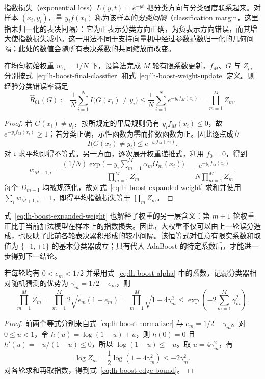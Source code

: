 指数损失（exponential loss）$L(y,t)=e^{-yt}$ 把分类方向与分类强度联系起来。对样本 $(x_i,y_i)$，量 $y_if(x_i)$ 称为该样本的\emph{分类间隔}（classification margin，这里指未归一化的表决间隔）：它为正表示分类方向正确，为负表示方向错误，而其增大使指数损失减小。这一用法不同于支持向量机中经过参数范数归一化的几何间隔；此处的数值会随所有表决系数的共同缩放而改变。

\begin{theorem}[训练误差的指数损失上界]
\label{thm:lh-boost-training-bound}
在均匀初始权重 $w_{1i}=1/N$ 下，设算法完成 $M$ 轮有限系数更新，$f_M$、$G$ 与 $Z_m$ 分别按式~\eqref{eq:lh-boost-final-classifier} 和式~\eqref{eq:lh-boost-weight-update} 定义。则经验分类错误率满足
\begin{equation}
 \widehat R_{01}(G):=\frac1N\sum_{i=1}^{N}I\bigl(G(x_i)\ne y_i\bigr)
 \leq\frac1N\sum_{i=1}^{N}e^{-y_if_M(x_i)}
 =\prod_{m=1}^{M}Z_m.
 \label{eq:lh-boost-training-bound}
\end{equation}
\end{theorem}
\begin{proof}
若 $G(x_i)\ne y_i$，按所规定的平局规则仍有 $y_if_M(x_i)\leq0$，故 $e^{-y_if_M(x_i)}\geq1$；若分类正确，示性函数为零而指数函数为正。因此逐点成立
\[
 I\bigl(G(x_i)\ne y_i\bigr)\leq e^{-y_if_M(x_i)}.
\]
对 $i$ 求平均即得不等式。另一方面，逐次展开权重递推式，利用 $f_0=0$，得到
\begin{equation}
 w_{M+1,i}=\frac{(1/N)\exp\bigl(-y_i\sum_{m=1}^{M}\alpha_mG_m(x_i)\bigr)}
                    {\prod_{m=1}^{M}Z_m}
           =\frac{e^{-y_if_M(x_i)}}{N\prod_{m=1}^{M}Z_m}.
 \label{eq:lh-boost-expanded-weight}
\end{equation}
每个 $D_{m+1}$ 均被规范化，故对式~\eqref{eq:lh-boost-expanded-weight} 求和并使用 $\sum_iw_{M+1,i}=1$，即得平均指数损失等于 $\prod_mZ_m$。
\end{proof}

式~\eqref{eq:lh-boost-expanded-weight} 也解释了权重的另一层含义：第 $m+1$ 轮权重正比于当前加法模型在样本上的指数损失。因此，大权重不仅可以由上一轮误分造成，也反映了此前各轮表决累积形成的较小间隔。该恒等式对任意有限实系数和取值为 $\{-1,+1\}$ 的基本分类器成立；只有代入 AdaBoost 的特定系数后，才能进一步得到下一结论。

\begin{theorem}[弱学习优势与指数型误差界]
\label{thm:lh-boost-edge-bound}
若每轮均有 $0<e_m<1/2$ 并采用式~\eqref{eq:lh-boost-alpha} 中的系数，记弱分类器相对随机猜测的优势为 $\gamma_m=1/2-e_m$，则
\begin{equation}
 \prod_{m=1}^{M}Z_m
 =\prod_{m=1}^{M}2\sqrt{e_m(1-e_m)}
 =\prod_{m=1}^{M}\sqrt{1-4\gamma_m^2}
 \leq\exp\left(-2\sum_{m=1}^{M}\gamma_m^2\right).
 \label{eq:lh-boost-edge-bound}
\end{equation}
\end{theorem}
\begin{proof}
前两个等式分别来自式~\eqref{eq:lh-boost-normalizer} 与 $e_m=1/2-\gamma_m$。对 $0\leq u<1$，令 $h(u)=\log(1-u)+u$，则 $h(0)=0$ 且 $h'(u)=-u/(1-u)\leq0$，所以 $\log(1-u)\leq-u$。取 $u=4\gamma_m^2$，有
\[
 \log Z_m=\frac12\log(1-4\gamma_m^2)\leq-2\gamma_m^2.
\]
对各轮求和再取指数，得到式~\eqref{eq:lh-boost-edge-bound}。
\end{proof}

